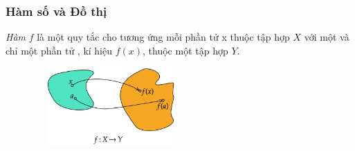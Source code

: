 
\begin{frame}
\frametitle{Hàm số và Đồ thị}
    \begin{tcolorbox}[colback=blue!10!, colframe=blue!50!black, title=Định nghĩa]
        \textit{Hàm} $f$ là một quy tắc cho tương ứng mỗi phần tử x thuộc tập hợp $X$ với một và chỉ một phần tử , kí hiệu $f(x)$, thuộc một tập hợp $Y$.
    \end{tcolorbox}
     \begin{figure}
      \centering
      \includegraphics[width=6cm, height= 3cm]{Slides/figure/anhxa - Copy.png}
     \end{figure}
\end{frame}

